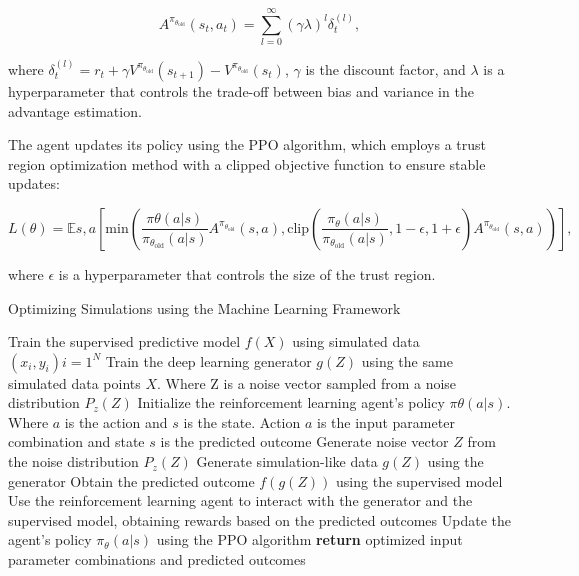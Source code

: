 \documentclass{article}
\begin{document}
\begin{equation}
    A^{\pi_{\theta_{\text{old}}}}(s_t, a_t) = \sum_{l=0}^{\infty} (\gamma \lambda)^l \delta_t^{(l)},
\end{equation}

where $\delta_t^{(l)} = r_t + \gamma V^{\pi_{\theta_{\text{old}}}}(s_{t+1}) - V^{\pi_{\theta_{\text{old}}}}(s_t)$, $\gamma$ is the discount factor, and $\lambda$ is a hyperparameter that controls the trade-off between bias and variance in the advantage estimation.

The agent updates its policy using the PPO algorithm, which employs a trust region optimization method with a clipped objective function to ensure stable updates:

\begin{equation}
    L(\theta) = \mathbb{E}{s, a} \left[\text{min}\left(\frac{\pi\theta(a|s)}{\pi_{\theta_{\text{old}}}(a|s)} A^{\pi_{\theta_{\text{old}}}}(s, a), \text{clip}\left(\frac{\pi_\theta(a|s)}{\pi_{\theta_{\text{old}}}(a|s)}, 1 - \epsilon, 1 + \epsilon\right) A^{\pi_{\theta_{\text{old}}}}(s, a)\right)\right],
\end{equation}

where $\epsilon$ is a hyperparameter that controls the size of the trust region.

\begin{algorithm}
    \caption{Optimizing Simulations using the Machine Learning Framework}
    \begin{algorithmic}[1]
        \State Train the supervised predictive model $f(X)$ using simulated data ${(x_i, y_i)}{i=1}^{N}$
        \State Train the deep learning generator $g(Z)$ using the same simulated data points $X$. Where Z  is a noise vector  sampled from a noise distribution $P_z(Z)$
        \State Initialize the reinforcement learning agent's policy $\pi\theta(a|s)$. Where $a$ is the action and $s$ is the state. Action $a$ is the input parameter combination and state $s$ is the predicted outcome
        \State Generate noise vector $Z$ from the noise distribution $P_z(Z)$
        \State Generate simulation-like data $g(Z)$ using the generator
        \State Obtain the predicted outcome $f(g(Z))$ using the supervised model
        \State Use the reinforcement learning agent to interact with the generator and the supervised model, obtaining rewards based on the predicted outcomes
        \State Update the agent's policy $\pi_\theta(a|s)$ using the PPO algorithm
        \EndFor
        \State \textbf{return} optimized input parameter combinations and predicted outcomes
    \end{algorithmic}
\end{algorithm}
\end{document}
